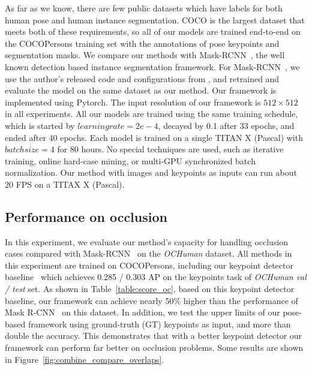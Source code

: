 \documentclass[10pt,twocolumn,letterpaper]{article}
\begin{document}
As far as we know, there are few public datasets which have labels for both human pose and human instance segmentation. COCO is the largest dataset that meets both of these requirements, so all of our models are trained end-to-end on the COCOPersons training set with the annotations of pose keypoints and segmentation masks. We compare our methods with Mask-RCNN~\cite{He2017Mask}, the well known detection based instance segmentation framework. For Mask-RCNN~\cite{He2017Mask}, we use the author's released code and configurations from \cite{Detectron2018}, and retrained and evaluate the model on the same dataset as our method. Our framework is implemented using Pytorch. The input resolution of our framework is 
$512 \times 512$ in all experiments. 
All our models are trained using the same training schedule, which is started by $learning rate=2e-4$, decayed by 0.1 after 33 epochs, and ended after 40 epochs. Each model is trained on a single TITAN X (Pascal) with $batchsize=4$ for 80 hours. No special techniques are used, such as iterative training, online hard-case mining, or multi-GPU synchronized batch normalization. Our method with images and keypoints as inputs can run about 20 FPS on a TITAX X (Pascal).

\subsection{Performance on occlusion}

In this experiment, we evaluate our method's capacity for handling occlusion cases compared with Mask-RCNN~\cite{He2017Mask} on the \emph{OCHuman} dataset. All methods in this experiment are trained on COCOPersons, including our keypoint detector baseline~\cite{Newell2016Associative} which achieves 0.285 / 0.303 AP on the keypoints task of \emph{OCHuman} \emph{val / test} set. As shown in Table~\ref{table:score_oc}, based on this keypoint detector baseline, our framework can achieve nearly 50\% higher than the performance of Mask R-CNN~\cite{He2017Mask} on this dataset. In addition, we test the upper limits of our pose-based framework using ground-truth (GT) keypoints as input, and more than double the accuracy. This demonstrates that with a better keypoint detector our framework can perform far better on occlusion problems.  Some results are shown in Figure~\ref{fig:combine_compare_overlaps}. 
\end{document}
